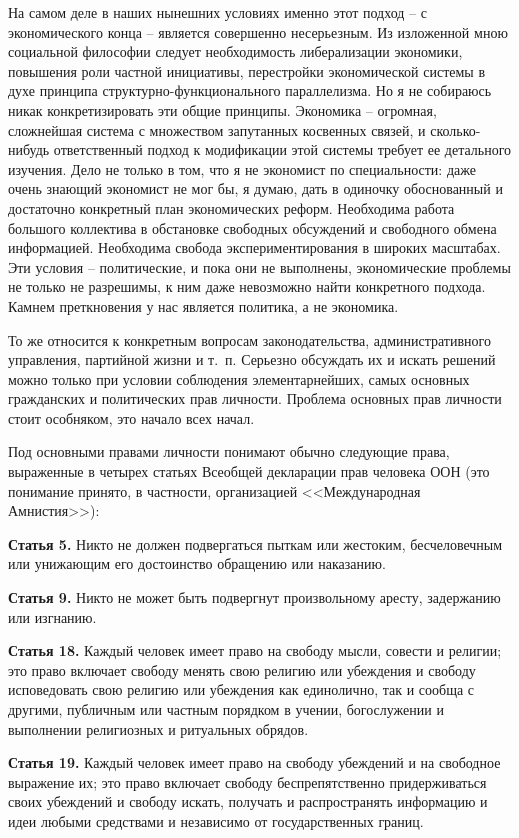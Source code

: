 \documentclass{book}
\begin{document}
На самом деле в наших нынешних условиях именно этот подход -- с экономического конца -- является совершенно несерьезным. Из изложенной мною социальной философии следует необходимость либерализации экономики, повышения роли частной инициативы, перестройки экономической системы в духе принципа структурно-функционального параллелизма. Но я не собираюсь никак конкретизировать эти общие принципы. Экономика -- огромная, сложнейшая система с мно­жеством запутанных косвенных связей, и сколько-нибудь ответственный подход к модификации этой системы требует ее детального изучения. Дело не только в том, что я не экономист по специальности: даже очень знающий экономист не мог бы, я думаю, дать в одиночку обоснованный и достаточно конкретный план экономических реформ. Необходима работа большого коллектива в обстановке свободных обсуждений и свободного обмена информацией. Необходима свобода экспериментирования в широких масштабах. Эти условия -- политические, и пока они не выполнены, экономические проблемы не только не 
разрешимы, к ним даже невозможно найти конкретного подхода. Камнем преткновения у нас является политика, а не экономика.

То же относится к конкретным вопросам законодательства, административного управления, партийной жизни и т.~п. Серьез­но обсуждать их и искать решений можно только при условии соблюдения элементарнейших, самых основных гражданских и политических прав личности. Проблема основных прав лич­ности стоит особняком, это начало всех начал.

Под основными правами личности понимают обычно следу­ющие права, выраженные в четырех статьях Всеобщей декла­рации прав человека ООН (это понимание принято, в частности, организацией <<Международная Амнистия>>):

\textbf{Статья 5.}  Никто не должен подвергаться пыткам или жестоким, бесчеловечным или унижающим его достоинство обращению или наказанию.

\textbf{Статья 9.}  Никто не может быть подвергнут произвольному аресту, задержанию или изгнанию.

\textbf{Статья 18.}  Каждый человек имеет право на свободу мысли, совести и религии; это право включает свободу менять свою религию или убеждения и свободу исповедовать свою религию или убеждения как единолично, так и сообща с другими, публичным или частным порядком в учении, богослужении и выполнении религиозных и ритуальных обрядов.

\textbf{Статья 19.} Каждый человек имеет право на свободу убежде­ний и на свободное выражение их; это право включает свободу беспрепятственно придерживаться своих убеждений и свободу искать, получать и распространять информацию и идеи любыми средствами и независимо от государственных границ.
\end{document}
